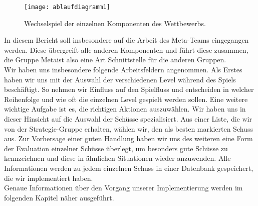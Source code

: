 \begin{figure} [h]
	\begin{center}
		\texttt{[image: ablaufdiagramm1]}
		\caption{Wechselspiel der einzelnen Komponenten des Wettbewerbs.}
	\end{center}
\end{figure}

In diesem Bericht soll insbesondere auf die Arbeit des Meta-Teams eingegangen werden. Diese übergreift alle anderen Komponenten und führt diese zusammen, die Gruppe \glqq Meta\grqq  ist also eine Art Schnittstelle für die anderen Gruppen.\\
Wir haben uns insbesondere folgende Arbeitsfeldern angenommen. Als Erstes haben wir uns mit der Auswahl der verschiedenen Level während des Spiels beschäftigt. So nehmen wir Einfluss auf den Spielfluss und entscheiden in welcher Reihenfolge und wie oft die einzelnen Level gespielt werden sollen.
Eine weitere wichtige Aufgabe ist es, die richtigen Aktionen auszuwählen. Wir haben uns in dieser Hinsicht auf die Auswahl der Schüsse spezialisiert. Aus einer Liste, die wir von der Strategie-Gruppe erhalten, wählen wir, den als besten markierten Schuss aus. Zur Vorhersage einer guten Handlung haben wir uns des weiteren eine Form der Evaluation einzelner Schüsse überlegt, um besonders gute Schüsse zu kennzeichnen und diese in ähnlichen Situationen wieder anzuwenden.
Alle Informationen werden zu jedem einzelnen Schuss in einer Datenbank gespeichert, die wir implementiert haben.\\
Genaue Informationen über den Vorgang unserer Implementierung werden im folgenden Kapitel näher ausgeführt.